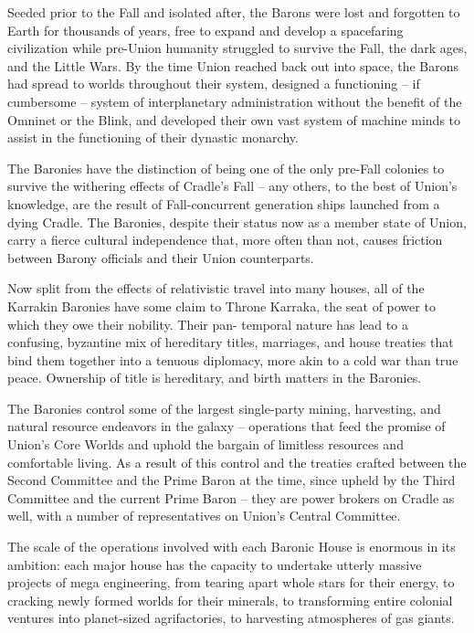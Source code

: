 Seeded prior to the Fall and isolated after, the Barons were lost and forgotten to Earth for
thousands of years, free to expand and develop a spacefaring civilization while pre-Union
humanity struggled to survive the Fall, the dark ages, and the Little Wars. By the time Union
reached back out into space, the Barons had spread to worlds throughout their system,
designed a functioning -- if cumbersome -- system of interplanetary administration without the
benefit of the Omninet or the Blink, and developed their own vast system of machine minds to
assist in the functioning of their dynastic monarchy.


The Baronies have the distinction of being one of the only pre-Fall colonies to survive the
withering effects of Cradle’s Fall -- any others, to the best of Union’s knowledge, are the result of
Fall-concurrent generation ships launched from a dying Cradle. The Baronies, despite their
status now as a member state of Union, carry a fierce cultural independence that, more often
than not, causes friction between Barony officials and their Union counterparts.


Now split from the effects of relativistic travel into many houses, all of the Karrakin Baronies have
some claim to Throne Karraka, the seat of power to which they owe their nobility. Their pan-
temporal nature has lead to a confusing, byzantine mix of hereditary titles, marriages, and house
treaties that bind them together into a tenuous diplomacy, more akin to a cold war than true
peace. Ownership of title is hereditary, and birth matters in the Baronies.


The Baronies control some of the largest single-party mining, harvesting, and natural resource
endeavors in the galaxy -- operations that feed the promise of Union’s Core Worlds and uphold
the bargain of limitless resources and comfortable living. As a result of this control and the
treaties crafted between the Second Committee and the Prime Baron at the time, since upheld
by the Third Committee and the current Prime Baron -- they are power brokers on Cradle as well,
with a number of representatives on Union’s Central Committee.


The scale of the operations involved with each Baronic House is enormous in its ambition: each
major house has the capacity to undertake utterly massive projects of mega engineering, from
tearing apart whole stars for their energy, to cracking newly formed worlds for their minerals, to
transforming entire colonial ventures into planet-sized agrifactories, to harvesting atmospheres of
gas giants.


